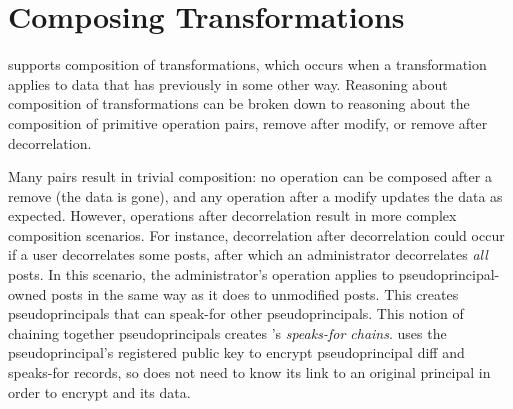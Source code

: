 \section{Composing \Xxing Transformations}
\label{s:composition}

\sys supports composition of \xxing transformations, which occurs when a
transformation applies to data that \sys has previously \xxed in
some other way.
%
Reasoning about composition of transformations can be broken down to reasoning
about the composition of primitive operation pairs, \eg remove after
modify, or remove after decorrelation.
%

%
Many pairs result in trivial composition: no operation can be composed after a
remove (the data is gone), and any operation after a modify updates the
data as expected. 
%
However, operations after decorrelation result in more complex composition scenarios.
%
For instance, decorrelation after decorrelation could occur if a user
decorrelates some posts, after which an administrator decorrelates \emph{all}
posts. In this scenario, the administrator's \xxing operation applies to
pseudoprincipal-owned posts in the same way as it does to unmodified posts. This
creates pseudoprincipals that can speak-for other pseudoprincipals.  This notion
of chaining together pseudoprincipals creates \sys's \emph{speaks-for chains}.
\sys uses the pseudoprincipal's registered public key to encrypt pseudoprincipal
diff and speaks-for records, so \sys does not need to know its link to an
original principal in order to encrypt and \xx its data.
%


